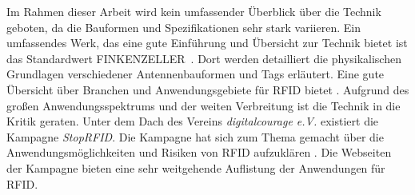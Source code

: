 Im Rahmen dieser Arbeit wird kein umfassender Überblick über die Technik geboten, da die Bauformen und Spezifikationen sehr stark variieren. Ein umfassendes Werk, das eine gute Einführung und Übersicht zur Technik bietet ist das Standardwert FINKENZELLER~\cite{finkenzeller2008rfid}. Dort werden detailliert die physikalischen Grundlagen verschiedener Antennenbauformen und Tags erläutert. Eine gute Übersicht über Branchen und Anwendungsgebiete für RFID bietet \cite{RFIDJournal}. Aufgrund des großen Anwendungsspektrums und der weiten Verbreitung ist die Technik in die Kritik geraten. Unter dem Dach des Vereins \textit{digitalcourage e.V.} existiert die Kampagne \textit{StopRFID}. Die Kampagne hat sich zum Thema gemacht über die Anwendungsmöglichkeiten und Risiken von RFID aufzuklären \cite{stoprfid2013}. Die Webseiten der Kampagne bieten eine sehr weitgehende Auflistung der Anwendungen für RFID.\\
%
